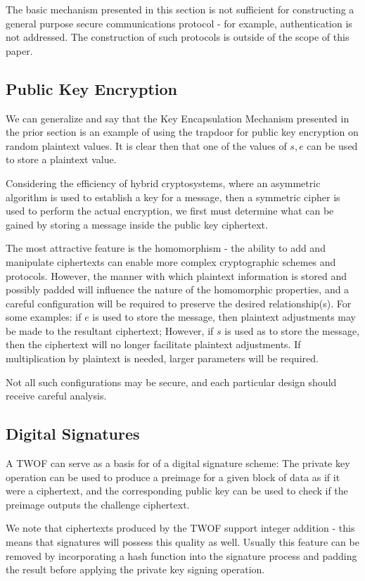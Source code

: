 \documentclass[preprint]{iacrtrans}
\begin{document}
The basic mechanism presented in this section is not sufficient for constructing a general purpose secure communications protocol - for example, authentication is not addressed. The construction of such protocols is outside of the scope of this paper. 

\subsection{Public Key Encryption}
We can generalize and say that the Key Encapsulation Mechanism presented in the prior section is an example of using the trapdoor for public key encryption on random plaintext values. It is clear then that one of the values of $s, e$ can be used to store a plaintext value.

Considering the efficiency of hybrid cryptosystems, where an asymmetric algorithm is used to establish a key for a message, then a symmetric cipher is used to perform the actual encryption, we first must determine what can be gained by storing a message inside the public key ciphertext.

The most attractive feature is the homomorphism - the ability to add and manipulate ciphertexts can enable more complex cryptographic schemes and protocols. However, the manner with which plaintext information is stored and possibly padded will influence the nature of the homomorphic properties, and a careful configuration will be required to preserve the desired relationship(s). For some examples: if $e$ is used to store the message, then plaintext adjustments may be made to the resultant ciphertext; However, if $s$ is used as to store the message, then the ciphertext will no longer facilitate plaintext adjustments. If multiplication by plaintext is needed, larger parameters will be required.

Not all such configurations may be secure, and each particular design should receive careful analysis.

\subsection{Digital Signatures}
A TWOF can serve as a basis for of a digital signature scheme: The private key operation can be used to produce a preimage for a given block of data as if it were a ciphertext, and the corresponding public key can be used to check if the preimage outputs the challenge ciphertext. 

We note that ciphertexts produced by the TWOF support integer addition - this means that signatures will possess this quality as well. Usually this feature can be removed by incorporating a hash function into the signature process and padding the result before applying the private key signing operation. 
\end{document}
